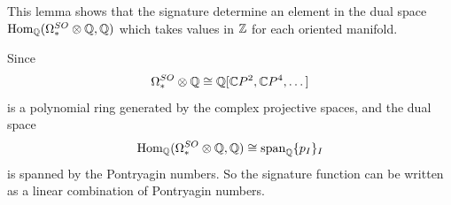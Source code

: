 \begin{remark}
    This lemma shows that the signature determine an element in the dual space $\mathrm{Hom}_{\mathbb{Q}}(\Omega_*^{SO}\otimes \mathbb{Q}, \mathbb{Q})$ 
    which takes values in $\mathbb{Z}$ for each oriented manifold. 
\end{remark}
Since 
\begin{equation*}
    \Omega_*^{SO} \otimes \mathbb{Q} \cong \mathbb{Q}[\mathbb{C} P^2, \mathbb{C} P^4, \dots]
\end{equation*}
is a polynomial ring generated by the complex projective spaces, 
and the dual space 
\begin{equation*}
    \mathrm{Hom}_{\mathbb{Q}}(\Omega_*^{SO}\otimes \mathbb{Q}, \mathbb{Q})\cong \mathrm{span}_{\mathbb{Q}}\{p_I\}_I
\end{equation*}
is spanned by the Pontryagin numbers. So the signature function can be written as a linear combination of Pontryagin numbers. 

